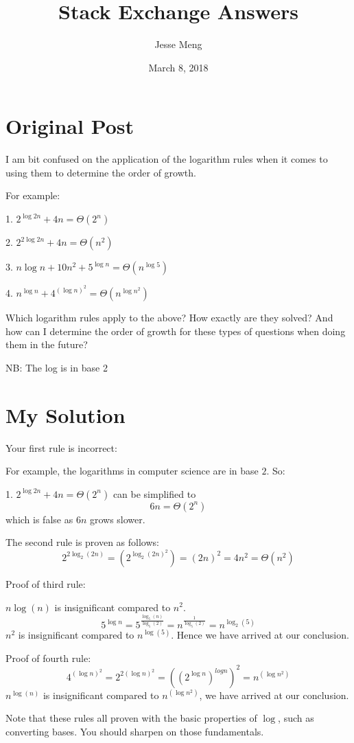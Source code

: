 \documentclass{article}
\title{Stack Exchange Answers}
\author{Jesse Meng }
\date{March 8, 2018}
\begin{document}
\maketitle

\section{Original Post}
I am bit confused on the application of the logarithm rules when it comes to using them to determine the order of growth. 

For example:

1. $ 2^{\log 2n} + 4n = \Theta(2^n) $ 

2. $ 2^{2\log 2n} + 4n = \Theta(n^2) $ 

3. $ n\log n + 10n^2 + 5^{\log n} = \Theta(n^{\log 5}) $ 

4. $ n^{\log n} + 4^{(\log n)^2} = \Theta(n^{\log n^2}) $ 

Which logarithm rules apply to the above? How exactly are they solved? And how can I determine the order of growth for these types of questions when doing them in the future?

NB: The log is in base 2

 
\section{My Solution}
Your first rule is incorrect:

For example, the logarithms in computer science are in base $2$.
So:

1. $ 2^{\log 2n} + 4n = \Theta(2^n) $ can be simplified to $$6n= \Theta(2^n)$$ which is false as $6n$ grows slower.

The second rule is proven as follows:
$$2^{2 \log_2(2n)}=\left(2^{\log_2(2n)^2}\right)=(2n)^2=4n^2=\Theta(n^2)$$

Proof of third rule:

$n\log(n)$ is insignificant compared to $n^2$.
$$5^{\log n}=5^\frac{\log_5(n)}{\log_5(2)}=n^\frac{1}{\log_5(2)}=n^{\log_2(5)}$$
$n^2$ is insignificant compared to $n^{\log(5)}$. Hence we have arrived at our conclusion.

Proof of fourth rule:
$$4^{(\log n)^2}=2^{2{(\log n)^2}}=((2^{\log n})^{logn})^2=n^{(\log n^2)}$$
$n^{\log(n)}$ is insignificant compared to $n^{(\log n^2)}$, we have arrived at our conclusion.

Note that these rules all proven with the basic properties of $\log$, such as converting bases. You should sharpen on those fundamentals.
\end{document}
